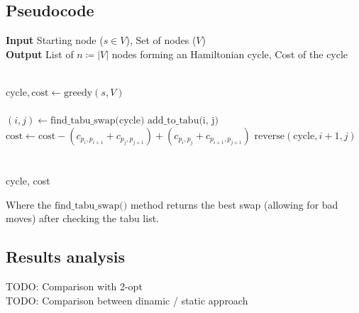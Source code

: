 \subsection{Pseudocode}
\begin{algorithm}
    \caption{tabu algorithm for the TSP}
    \hspace*{\algorithmicindent} \textbf{Input} Starting node ($s\in V$), Set of nodes ($V$)\\
    \hspace*{\algorithmicindent} \textbf{Output} List of $n\coloneq|V|$ nodes forming an Hamiltonian cycle, Cost of the cycle
    \begin{algorithmic}\\
        
        \State $\mbox{cycle}, \mbox{cost} \gets \mbox{greedy}(s, V)$\\

        \\
            \State $(i, j)\gets \mbox{find\_tabu\_swap(cycle)}$
            \State $\mbox{add\_to\_tabu(i, j)}$
            \State $\mbox{cost}\gets\mbox{cost}-(c_{p_i,p_{i+1}}+c_{p_j,p_{j+1}})+(c_{p_i,p_{j}}+c_{p_{i+1},p_{j+1}})$
            \State $\mbox{reverse}(\mbox{cycle}, i+1, j)$\\

        \EndWhile\\\\

        \Return cycle, cost
    \end{algorithmic}
\end{algorithm}
Where the $\mbox{find\_tabu\_swap()}$ method returns the best swap (allowing for bad moves) after checking the tabu list.

\subsection{Results analysis}
TODO: Comparison with 2-opt\\

TODO: Comparison between dinamic / static approach
